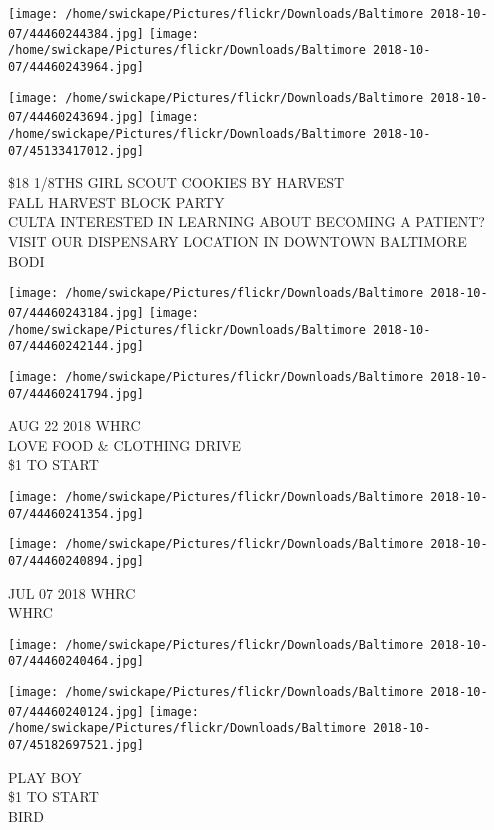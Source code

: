 \documentclass[10pt,letterpaper]{article}
\begin{document}
\texttt{[image: /home/swickape/Pictures/flickr/Downloads/Baltimore 2018-10-07/44460244384.jpg]}
\texttt{[image: /home/swickape/Pictures/flickr/Downloads/Baltimore 2018-10-07/44460243964.jpg]}

\texttt{[image: /home/swickape/Pictures/flickr/Downloads/Baltimore 2018-10-07/44460243694.jpg]}
\texttt{[image: /home/swickape/Pictures/flickr/Downloads/Baltimore 2018-10-07/45133417012.jpg]}

\$18 1/8THS GIRL SCOUT COOKIES BY HARVEST\\
FALL HARVEST BLOCK PARTY\\
CULTA INTERESTED IN LEARNING ABOUT BECOMING A PATIENT?  VISIT OUR DISPENSARY LOCATION IN DOWNTOWN BALTIMORE\\
BODI
\pagebreak

\texttt{[image: /home/swickape/Pictures/flickr/Downloads/Baltimore 2018-10-07/44460243184.jpg]}
\texttt{[image: /home/swickape/Pictures/flickr/Downloads/Baltimore 2018-10-07/44460242144.jpg]}

\texttt{[image: /home/swickape/Pictures/flickr/Downloads/Baltimore 2018-10-07/44460241794.jpg]}

AUG 22 2018 WHRC\\
LOVE FOOD \& CLOTHING DRIVE\\
\$1 TO START
\pagebreak

\texttt{[image: /home/swickape/Pictures/flickr/Downloads/Baltimore 2018-10-07/44460241354.jpg]}

\vspace{0.25in}
\texttt{[image: /home/swickape/Pictures/flickr/Downloads/Baltimore 2018-10-07/44460240894.jpg]}

JUL 07 2018 WHRC\\
WHRC
\pagebreak

\texttt{[image: /home/swickape/Pictures/flickr/Downloads/Baltimore 2018-10-07/44460240464.jpg]}

\vspace{0.25in}
\texttt{[image: /home/swickape/Pictures/flickr/Downloads/Baltimore 2018-10-07/44460240124.jpg]}
\texttt{[image: /home/swickape/Pictures/flickr/Downloads/Baltimore 2018-10-07/45182697521.jpg]}

PLAY BOY\\
\$1 TO START\\
BIRD
\pagebreak
\end{document}
